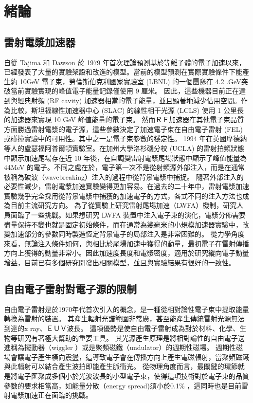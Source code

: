 
\chapter{緒論}





\section{雷射電漿加速器}
自從 Tajima 和 Dawson 於 1979 年首次理論預測基於等離子體的電子加速以來，已經發表了大量的實驗架設和改進的模型。當前的模型預測在實際實驗條件下能產生約 10GeV 電子束，勞倫斯伯克利國家實驗室 (LBNL) 的一個團隊在 4.2 .GeV突破當前實驗實現的峰值電子能量記錄僅使用 9 厘米。
因此，這些機器目前正在達到與經典射頻 (RF cavity) 加速器相當的電子能量，並且顯著地減少佔用空間。作為比較，斯坦福線性加速器中心 (SLAC) 的線性相干光源 (LCLS) 使用 1 公里長的加速器來實現 10 GeV 峰值能量的電子束。
然而ＲＦ加速器在其他電子束品質方面勝過雷射電漿的電子源，這些參數決定了加速電子束在自由電子雷射 (FEL) 或碰撞實驗中的可用性。其中之一是電子束參數的穩定性。
1994 年在英國摩德納等人的盧瑟福阿普爾頓實驗室。在加州大學洛杉磯分校 (UCLA) 的雷射拍頻狀態中顯示加速尾場存在近 10 年後，在自調變雷射電漿尾場狀態中顯示了峰值能量為 44MeV 的電子。不同之處在於，電子第一次不是從射頻源外部注入，而是在通常被稱為破波（wavebreaking）注入的過程中從背景電漿中捕捉。
隨著外部注入的必要性減少，雷射電漿加速實驗變得更加容易。在過去的二十年中，雷射電漿加速實驗幾乎完全採用從背景電漿中捕獲的加速電子的方式，各式不同的注入方法也成為目前主流研究方向。
為了從實驗上研究雷射尾場加速（LWFA）機制，研究人員面臨了一些挑戰。如果想研究 LWFA 裝置中注入電子束的演化，電漿分佈需要盡量保持不變也就是固定初始條件，而在通常為幾毫米的小規模加速器實驗中，改變加速部分的參數同時製造恆定背景電子的局部注入是非常困難的。
從力學角度來看，無論注入條件如何，與相比於尾場加速中獲得的動量，最初電子在雷射傳播方向上獲得的動量非常小。因此加速度長度和電漿密度，適用於研究縱向電子動量增益，目前已有多個研究開發出相關模型，並且與實驗結果有很好的一致性。
\section{自由電子雷射對電子源的限制}
自由電子雷射是於1970年代首次引入的概念，是一種從相對論性電子束中提取能量轉換為雷射的裝置。
其產生輻射光譜範圍非常廣，甚至能產生傳統雷射光源無法到達的x ray、ＥＵＶ波長。
這項優勢是使自由電子雷射成為對於材料、化學、生物等研究有著極大幫助的重要工具。
其光源產生原理是將相對論性的自由電子送進稱為擺動器（wiggler ）或是聚頻磁鐵（undulator）的週期性磁場。
週期性磁場會讓電子產生橫向震盪，這導致電子會在傳播方向上產生電磁輻射，當聚頻磁鐵與此輻射可以結合產生波拍即能產生脈衝光。
從物理角度而言，最關鍵的環節就是將電子匯聚成多個小於光波波長的小型電子束，使得這項技術對於電子束的品質參數的要求相當高，如能量分散\cite{PhysRevX031019}（energy spread)須小於0.1\% ，這同時也是目前雷射電漿加速正在面臨的挑戰。
